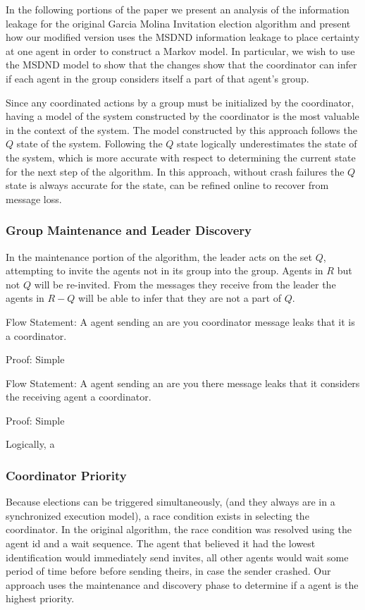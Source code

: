 In the following portions of the paper we present an analysis of the information leakage for the original Garcia Molina Invitation election algorithm and present how our modified version uses the MSDND information leakage to place certainty at one agent in order to construct a Markov model. In particular, we wish to use the MSDND model to show that the changes show that the coordinator can infer if each agent in the group considers itself a part of that agent's group.

Since any coordinated actions by a group must be initialized by the coordinator, having a model of the system constructed by the coordinator is the most valuable in the context of the system. The model constructed by this approach follows the $Q$ state of the system. Following the $Q$ state logically underestimates the state of the system, which is more accurate with respect to determining the current state for the next step of the algorithm. In this approach, without crash failures the $Q$ state is always accurate for the state, can be refined online to recover from message loss.

\subsubsection{Group Maintenance and Leader Discovery}

In the maintenance portion of the algorithm, the leader acts on the set $Q$, attempting to invite the agents not in its group into the group. Agents in $R$ but not $Q$ will be re-invited. From the messages they receive from the leader the agents in $R-Q$ will be able to infer that they are not a part of $Q$.

Flow Statement: A agent sending an are you coordinator message leaks that it is a coordinator.

Proof: Simple

Flow Statement: A agent sending an are you there message leaks that it considers the receiving agent a coordinator.

Proof: Simple

Logically, a 

\subsubsection{Coordinator Priority}

Because elections can be triggered simultaneously, (and they always are in a synchronized execution model), a race condition exists in selecting the coordinator. In the original algorithm, the race condition was resolved using the agent id and a wait sequence. The agent that believed it had the lowest identification would immediately send invites, all other agents would wait some period of time before before sending theirs, in case the sender crashed. Our approach uses the maintenance and discovery phase to determine if a agent is the highest priority.

